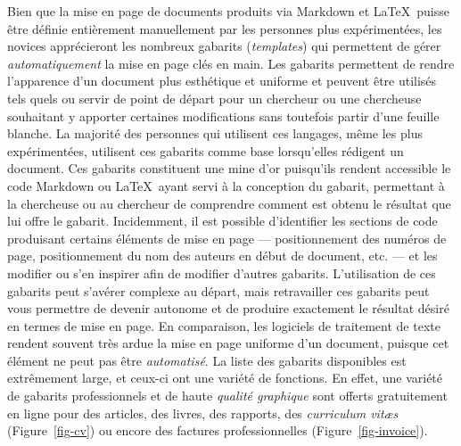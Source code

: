 \documentclass[
  letterpaper,
  DIV=11,
  numbers=noendperiod]{scrreprt}
\begin{document}
Bien que la mise en page de documents produits via Markdown et
\LaTeX~puisse être définie entièrement manuellement par les personnes
plus expérimentées, les novices apprécieront les nombreux gabarits
(\emph{templates}) qui permettent de gérer \emph{automatiquement} la
mise en page clés en main. Les gabarits permettent de rendre l'apparence
d'un document plus esthétique et uniforme et peuvent être utilisés tels
quels ou servir de point de départ pour un chercheur ou une chercheuse
souhaitant y apporter certaines modifications sans toutefois partir
d'une feuille blanche. La majorité des personnes qui utilisent ces
langages, même les plus expérimentées, utilisent ces gabarits comme base
lorsqu'elles rédigent un document. Ces gabarits constituent une mine
d'or puisqu'ils rendent accessible le code Markdown ou \LaTeX~ayant
servi à la conception du gabarit, permettant à la chercheuse ou au
chercheur de comprendre comment est obtenu le résultat que lui offre le
gabarit. Incidemment, il est possible d'identifier les sections de code
produisant certains éléments de mise en page --- positionnement des
numéros de page, positionnement du nom des auteurs en début de document,
etc. --- et les modifier ou s'en inspirer afin de modifier d'autres
gabarits. L'utilisation de ces gabarits peut s'avérer complexe au
départ, mais retravailler ces gabarits peut vous permettre de devenir
autonome et de produire exactement le résultat désiré en termes de mise
en page. En comparaison, les logiciels de traitement de texte rendent
souvent très ardue la mise en page uniforme d'un document, puisque cet
élément ne peut pas être \emph{automatisé}. La liste des gabarits
disponibles est extrêmement large, et ceux-ci ont une variété de
fonctions. En effet, une variété de gabarits professionnels et de haute
\emph{qualité graphique} sont offerts gratuitement en ligne pour des
articles, des livres, des rapports, des \emph{curriculum vitæs}
(Figure~\ref{fig-cv}) ou encore des factures professionnelles
(Figure~\ref{fig-invoice}).
\end{document}
